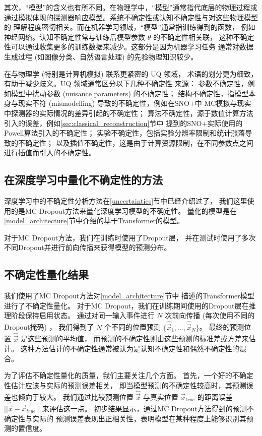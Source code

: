 其次，“模型”的含义也有所不同。在物理学中，“模型”通常指代底层的物理过程或
通过模拟体现的探测器响应模型。系统不确定性或认知不确定性与对这些物理模型的
理解程度密切相关。而在机器学习领域，“模型”通常指训练得到的函数，
例如神经网络。认知不确定性常与训练后模型参数 $\theta$ 的不确定性相关联，
这种不确定性可以通过收集更多的训练数据来减少。这部分是因为机器学习任务
通常对数据生成过程 (如图像分类、自然语言处理) 的先验物理知识较少。

在与物理学 (特别是计算机模拟) 联系更紧密的 UQ 领域，
术语的划分更为细致，有助于减少歧义。UQ 领域通常区分以下几种不确定性
来源：
参数不确定性，例如模型中扰动参数 (nuisance parameters) 的不确定性；
结构不确定性，指模型本身与现实不符 (mismodelling) 导致的不确定性，例如在SNO+中
MC模拟与现实中探测器的实际情况的差异引起的不确定性；
算法不确定性，源于数值计算方法引入的误差，例如\ref{sec:classical_reconstruction}节中
提到的SNO+实际使用的Powell算法引入的不确定性；
实验不确定性，包括实验分辨率限制和统计涨落导致的不确定性；
以及插值不确定性，这是由于计算资源限制，在不同参数点之间进行插值而引入的不确定性。

\subsection{在深度学习中量化不确定性的方法}

深度学习中的不确定性分析方法在\ref{uncertainties}节中已经介绍过了，
我们这里使用的是MC Dropout方法来量化深度学习模型的不确定性。
量化的模型是在\ref{model_architecture}节中介绍的基于Transformer的模型。

对于MC Dropout方法，我们在训练时使用了Dropout层，
并在测试时使用了多次不同Dropout并进行前向传播来获得模型的预测分布。

\subsection{不确定性量化结果}

我们使用了MC Dropout方法对\ref{model_architecture}节中
描述的Transformer模型进行了不确定性量化。
对于MC Dropout，我们在训练期间使用的Dropout层在推理阶段保持启用状态。
通过对同一输入事件进行 $N$ 次前向传播 (每次使用不同的Dropout掩码) ，
我们得到了 $N$ 个不同的位置预测 
$\{\hat{\vec{x}}_1, \dots, \hat{\vec{x}}_N\}$。
最终的预测位置 $\hat{\vec{x}}$ 是这些预测的平均值，
而预测的不确定性则由这些预测的标准差或方差来估计。
这种方法估计的不确定性通常被认为是认知不确定性和偶然不确定性的混合。

为了评估不确定性量化的质量，我们主要关注几个方面。
首先，一个好的不确定性估计应该与实际的预测误差相关，
即当模型预测的不确定性较高时，其预测误差也倾向于较大。
我们通过比较预测位置 $\hat{\vec{x}}$ 与真实位置 
$\vec{x}_{true}$ 的距离误差 $||\hat{\vec{x}} - \vec{x}_{true}||$ 
来评估这一点。
初步结果显示，通过MC Dropout方法得到的预测不确定性与实际的
预测误差表现出正相关性，表明模型在某种程度上能够识别其预测的置信度。

